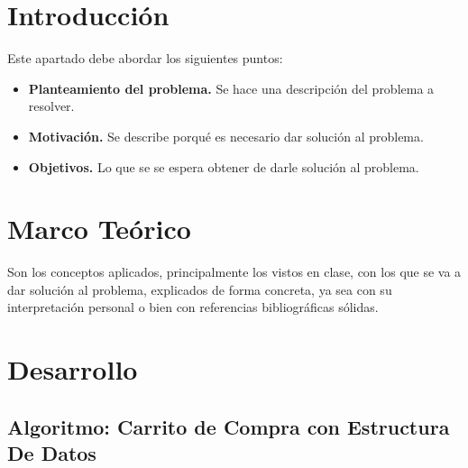 \documentclass[letterpaper,12pt,oneside]{article}
\begin{document}
\tableofcontents
\clearpage
    

\section{Introducción} %

Este apartado debe abordar los siguientes puntos:

\begin{itemize}
    \item \textbf{Planteamiento del problema.} Se hace una descripción del problema a resolver.
    \item \textbf{Motivación.} Se describe porqué es necesario dar solución al problema.
    \item \textbf{Objetivos.} Lo que se se espera obtener de darle solución al problema.
\end{itemize}

\section{Marco Teórico}

Son los conceptos aplicados, principalmente los vistos en clase, con los que se va a dar solución al problema, explicados de forma concreta, ya sea con su interpretación personal o bien con referencias bibliográficas sólidas.~\cite{10.5555/576122}

\section{Desarrollo}

\subsection{Algoritmo: Carrito de Compra con Estructura De Datos}
\end{document}

